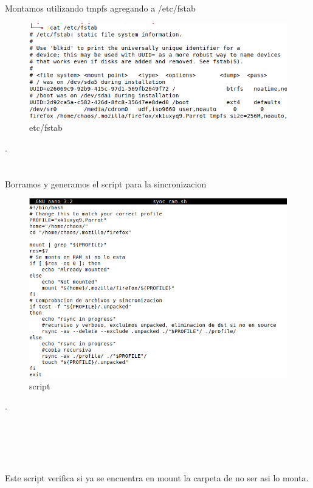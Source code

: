 \documentclass{article}
\begin{document}
Montamos utilizando tmpfs agregando a /etc/fstab 
\begin{figure}[h!]
\centering
\includegraphics[scale=0.9]{imgs/fstab.png}
\caption{etc/fstab}
\label{fig:universe}
\end{figure}

. \\ \\ \\ 
Borramos y generamos el script para la sincronizacion
\begin{figure}[h!]
\centering
\includegraphics[scale=0.8]{imgs/script.png}
\caption{script}
\label{fig:universe}
\end{figure}
. \\ \\ \\ \\ \\ \\ 
Este script verifica si ya se encuentra en mount la carpeta de no ser asi lo monta.
\end{document}
